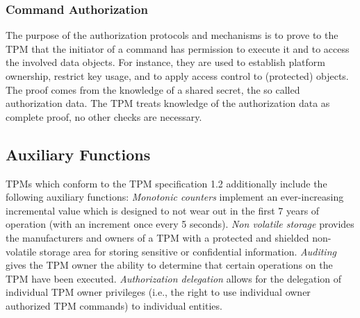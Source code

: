 \documentclass[runningheads]{llncs}
\begin{document}
\subsubsection{Command Authorization}
The purpose of the authorization protocols and mechanisms is to prove to the TPM that the
initiator of a command has permission to execute it and to access the involved data objects.
For instance, they are used to establish platform ownership, restrict key usage, and to
apply access control to (protected) objects. The proof comes from the knowledge of a shared
secret, the so called authorization data. The TPM treats knowledge of the authorization data
as complete proof, no other checks are necessary.

%

\subsection{Auxiliary Functions}
TPMs which conform to the TPM specification 1.2 additionally include the following auxiliary
functions: \emph{Monotonic counters} implement an ever-increasing incremental value which is
designed to not wear out in the first 7 years of operation (with an increment once every 5 seconds).
\emph{Non volatile storage} provides the manufacturers and owners of a TPM with a protected and
shielded non-volatile storage area for storing sensitive or confidential information.
\emph{Auditing} gives the TPM owner the ability to determine that certain operations on the TPM
have been executed. \emph{Authorization delegation} allows for the delegation of individual TPM
owner privileges (i.e., the right to use individual owner authorized TPM commands) to individual
entities.
\end{document}
